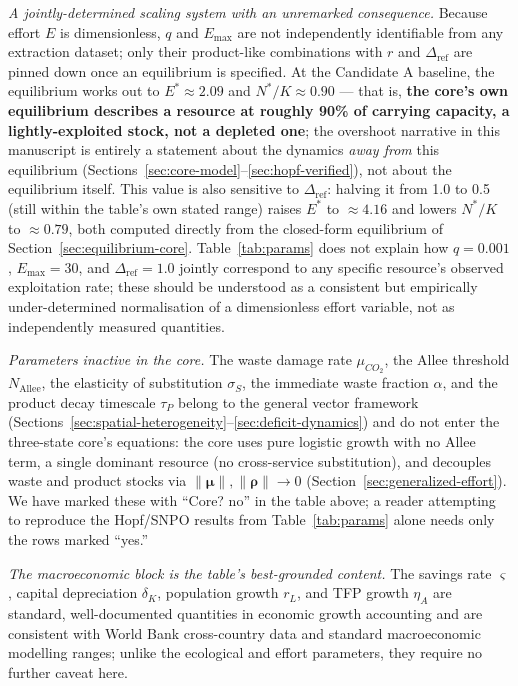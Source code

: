 \documentclass[twocolumn,10pt]{article}
\begin{document}
\emph{A jointly-determined scaling system with an unremarked consequence.} Because effort $E$ is dimensionless, $q$ and $E_{\max}$ are not independently identifiable from any extraction dataset; only their product-like combinations with $r$ and $\Delta_{\text{ref}}$ are pinned down once an equilibrium is specified. At the Candidate A baseline, the equilibrium works out to $E^*\approx2.09$ and $N^*/K\approx0.90$ — that is, \textbf{the core's own equilibrium describes a resource at roughly 90\% of carrying capacity, a lightly-exploited stock, not a depleted one}; the overshoot narrative in this manuscript is entirely a statement about the dynamics \emph{away from} this equilibrium (Sections~\ref{sec:core-model}--\ref{sec:hopf-verified}), not about the equilibrium itself. This value is also sensitive to $\Delta_{\text{ref}}$: halving it from 1.0 to 0.5 (still within the table's own stated range) raises $E^*$ to $\approx4.16$ and lowers $N^*/K$ to $\approx0.79$, both computed directly from the closed-form equilibrium of Section~\ref{sec:equilibrium-core}. Table~\ref{tab:params} does not explain how $q=0.001$, $E_{\max}=30$, and $\Delta_{\text{ref}}=1.0$ jointly correspond to any specific resource's observed exploitation rate; these should be understood as a consistent but empirically under-determined normalisation of a dimensionless effort variable, not as independently measured quantities.

\emph{Parameters inactive in the core.} The waste damage rate $\mu_{CO_2}$, the Allee threshold $N_{\text{Allee}}$, the elasticity of substitution $\sigma_S$, the immediate waste fraction $\alpha$, and the product decay timescale $\tau_P$ belong to the general vector framework (Sections~\ref{sec:spatial-heterogeneity}--\ref{sec:deficit-dynamics}) and do not enter the three-state core's equations: the core uses pure logistic growth with no Allee term, a single dominant resource (no cross-service substitution), and decouples waste and product stocks via $\|\boldsymbol\mu\|,\|\boldsymbol\rho\|\to0$ (Section~\ref{sec:generalized-effort}). We have marked these with ``Core? no'' in the table above; a reader attempting to reproduce the Hopf/SNPO results from Table~\ref{tab:params} alone needs only the rows marked ``yes.''

\emph{The macroeconomic block is the table's best-grounded content.} The savings rate $\varsigma$, capital depreciation $\delta_K$, population growth $r_L$, and TFP growth $\eta_A$ are standard, well-documented quantities in economic growth accounting and are consistent with World Bank cross-country data and standard macroeconomic modelling ranges; unlike the ecological and effort parameters, they require no further caveat here.
\end{document}
